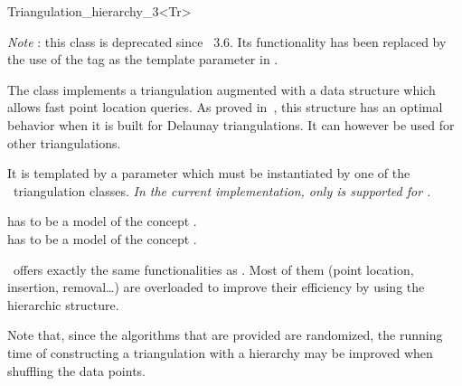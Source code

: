 

\begin{ccRefClass}{Triangulation_hierarchy_3<Tr>}

\begin{ccDeprecated}

{\em Note} : this class is deprecated since \cgal\ 3.6.  Its functionality has
been replaced by the use of the  tag as the
 template parameter in .

\ccDefinition

The class  implements a triangulation augmented
with a data structure which allows fast point location queries.  As proved
in~\cite{cgal:d-dh-02}, this structure has an optimal behavior when it is built
for Delaunay triangulations.  It can however be used for other triangulations.


\ccParameters

It is templated by a parameter which must be instantiated by one of the \cgal\
triangulation classes.  \textit{In the current implementation, only
\ccc{Delaunay_triangulation_3} is supported for \ccc{Tr}.}

 has to be a model of the concept
.\\
 has to be a model of the concept
.

\ccInheritsFrom


\ccRefName\ offers exactly the same functionalities as .
Most of them (point location, insertion, removal\ldots) are overloaded to
improve their efficiency by using the hierarchic structure. 

Note that, since the algorithms that are provided are randomized, the
running time of constructing a triangulation with a hierarchy may be
improved when shuffling the data points.


\end{ccDeprecated}
\end{ccRefClass}
